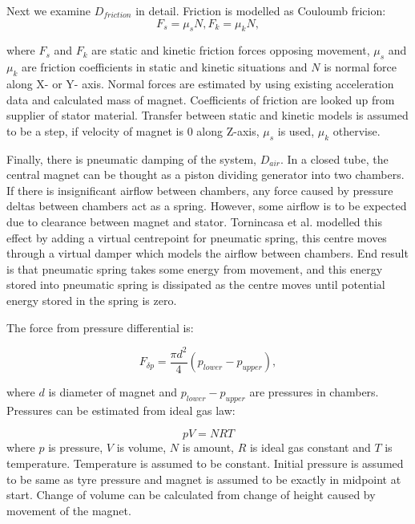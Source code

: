 Next we examine $D_{friction}$ in detail. Friction is modelled as Couloumb fricion:
\begin{equation}\label{eq:couloumb_friction}
  F_s = \mu_sN,
  F_k = \mu_kN,
\end{equation}

where $F_s $ and $ F_k $ are static and kinetic friction forces opposing movement, $\mu_s$ and $\mu_k$ are friction coefficients in static and kinetic situations and $N$ is normal force along X- or Y- axis. Normal forces are estimated by using existing acceleration data and calculated mass of magnet. Coefficients of friction are looked up from supplier of stator material. Transfer between static and kinetic models is assumed to be a step, if velocity of magnet is 0 along Z-axis, $\mu_s$ is used, $\mu_k$ othervise.

Finally, there is pneumatic damping of the system, $D_{air}$. In a closed tube, the central magnet can be thought as a piston dividing generator into two chambers. If there is insignificant airflow between chambers, any force caused by pressure deltas between chambers act as a spring. However, some airflow is to be expected due to clearance between magnet and stator. Tornincasa et al. \cite{Tornincasa2012} modelled this effect by adding a virtual centrepoint for pneumatic spring, this centre moves through a virtual damper which models the airflow between chambers. End result is that pneumatic spring takes some energy from movement, and this energy stored into pneumatic spring is dissipated as the centre moves until potential energy stored in the spring is zero. 

The force from pressure differential is:

\begin{equation}
  F_{\delta p} = \frac{\pi d^2}{4}(p_{lower}-p_{upper}),
\end{equation}

where $d$ is diameter of magnet and $p_{lower}-p_{upper}$ are pressures in chambers. Pressures can be estimated from ideal gas law:

\begin{equation}
  pV = NRT
\end{equation}
where $p$ is pressure, $V$ is volume, $N$ is amount, $R$ is ideal gas constant and $T$ is temperature. Temperature is assumed to be constant. Initial pressure is assumed to be same as tyre pressure and magnet is assumed to be exactly in midpoint at start. Change of volume can be calculated from change of height caused by movement of the magnet. 

